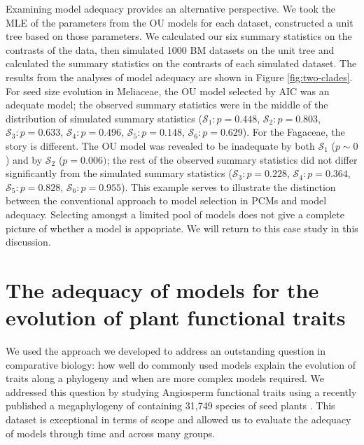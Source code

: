 \documentclass[a4paper,12pt]{article}
\begin{document}
Examining model adequacy provides an alternative perspective. We took the MLE of the parameters from the OU models for each dataset, constructed a unit tree based on those parameters. We calculated our six summary statistics on the contrasts of the data, then simulated 1000 BM datasets on the unit tree and calculated the summary statistics on the contrasts of each simulated dataset. The results from the analyses of model adequacy are shown in Figure \ref{fig:two-clades}. For seed size evolution in Meliaceae, the OU model selected by AIC was an adequate model; the observed summary statistics were in the middle of the distribution of simulated summary statistics ($\mathcal{S}_1: p=0.448$, $\mathcal{S}_2: p=0.803$, $\mathcal{S}_3: p=0.633$, $\mathcal{S}_4:p=0.496$, $\mathcal{S}_5: p=0.148$, $\mathcal{S}_6: p=0.629$). For the Fagaceae, the story is different. The OU model was revealed to be inadequate by both $\mathcal{S}_1$ ($p \sim 0$) and by $\mathcal{S}_2$ ($p=0.006)$; the rest of the observed summary statistics did not differ significantly from the simulated summary statistics ($\mathcal{S}_3: p=0.228$, $\mathcal{S}_4:p=0.364$, $\mathcal{S}_5: p=0.828$, $\mathcal{S}_6: p=0.955$). This example serves to illustrate the distinction between the conventional approach to model selection in PCMs and model adequacy. Selecting amongst a limited pool of models does not give a complete picture of whether a model is appopriate. We will return to this case study in this discussion.


\section{The adequacy of models for the evolution of plant functional traits}

We used the approach we developed to address an outstanding question in comparative biology: how well do commonly used models explain the evolution of traits along a phylogeny and when are more complex models required. We addressed this question by studying Angiosperm functional traits using a recently published a megaphylogeny of containing 31,749 species of seed plants \citep{Zanne2013}. This dataset is exceptional in terms of scope and allowed us to evaluate the adequacy of models through time and across many groups.  
\end{document}
